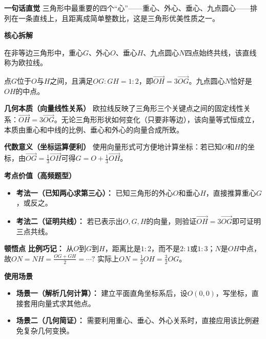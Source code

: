 \begin{explanationbox}
	\textbf{\textcolor{CExplanation}{一句话直觉}}
	三角形中最重要的四个“心”——重心、外心、垂心、九点圆心——排列在一条直线上，且距离成简单整数比，这是三角形优美性质之一。

	\medskip
	\textbf{\textcolor{CExplanation}{核心拆解}}
	\begin{description}[style=nextline, leftmargin=2.8em, labelsep=0.5em, itemsep=0.45em]
		\item[\textbf{要点一（四点共线）：}]
			在非等边三角形中，重心$G$、外心$O$、垂心$H$、九点圆心$N$四点始终共线，该直线称为欧拉线。
		\item[\textbf{要点二（三等分比例）：}]
			点$G$位于$O$与$H$之间，且满足$OG:GH=1:2$，即$\overrightarrow{OH}=3\overrightarrow{OG}$。九点圆心$N$恰好是$OH$的中点。
	\end{description}

	\medskip
	\textbf{\textcolor{CExplanation}{几何本质（向量线性关系）}}
	欧拉线反映了三角形三个关键点之间的固定线性关系：$\overrightarrow{OH}=3\overrightarrow{OG}$。无论三角形形状如何变化（只要非等边），该向量等式恒成立，本质由重心和中线的比例、垂心和外心的向量合成所致。

	\medskip
	\textbf{\textcolor{CExplanation}{代数意义（坐标运算便利）}}
	使用向量形式可方便地计算坐标：若已知$O$和$H$的坐标，由$\overrightarrow{OG}=\frac13\overrightarrow{OH}$可得$G = O + \frac13 \overrightarrow{OH}$。

	\medskip
	\textbf{\textcolor{CExplanation}{考点价值（高频题型）}}
	\begin{itemize}[leftmargin=*, itemsep=0.5em, topsep=0.4em]
		\item \textbf{考法一（已知两心求第三心）：} 已知三角形的外心$O$和垂心$H$，直接推算重心$G$，或反之。
		\item \textbf{考法二（证明共线）：} 若已表示出$O,G,H$的向量，则验证$\overrightarrow{OH}=3\overrightarrow{OG}$即可证明三点共线。
	\end{itemize}

	\medskip
	\textbf{\textcolor{CExplanation}{顿悟点}}
	\textbf{比例巧记：} 从$O$到$G$到$H$，距离比是$1:2$，而不是$2:1$或$1:3$；$N$是$OH$中点，故$ON=NH=\frac{OG+GH}{2}=\cdots?$ 实际上$ON=\frac12OH=\frac32OG$。

	\medskip
	\textbf{\textcolor{CExplanation}{使用场景}}
	\begin{itemize}[leftmargin=*, itemsep=0.5em, topsep=0.4em]
		\item \textbf{场景一（解析几何计算）：} 建立平面直角坐标系后，设$O(0,0)$，写坐标，直接套用向量式求其他点。
		\item \textbf{场景二（几何简证）：} 需要利用重心、垂心、外心关系时，直接应用该比例避免复杂几何变换。
	\end{itemize}

\end{explanationbox}
